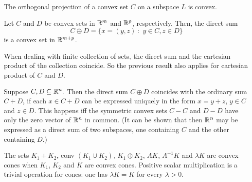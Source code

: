 \documentclass[11pt,a4paper]{article}
\begin{document}
\begin{corollary}
    The orthogonal projection of a convex set $C$ on a subspace $L$ is convex.
\end{corollary}


\begin{theorem}\label{thm:direct_sum_convex}
    Let $C$ and $D$ be convex sets in $\mathbb{R}^m$ and $\mathbb{R}^p$, respectively. Then, the direct sum
    \begin{equation*}
        C\oplus D = \{x = (y,z)\;:\; y\in C, z\in D\}
    \end{equation*}
    is a convex set in $\mathbb{R}^{m+p}$.
\end{theorem}

\begin{remark}\label{remark:direct_sum_cartesian_product}
    When dealing with finite collection of sets, the direct sum and the cartesian product of the collection coincide. So the previous result also applies for cartesian product of $C$ and $D$.
\end{remark}

\begin{remark}
    Suppose $C,D\subseteq\mathbb{R}^n$. Then the direct sum $C\oplus D$ coincides with the ordinary sum $C+D$, if each $x\in C+D$ can be expressed uniquely in the form $x = y+z$, $y\in C$ and $z\in D$. This happens iff the symmetric convex sets $C-C$ and $D-D$ have only the zero vector of $\mathbb{R}^n$ in common. (It can be shown that then $\mathbb{R}^n$ may be expressed as a direct sum of two subspaces, one containing $C$ and the other containing $D$.)
\end{remark}


\begin{remark}
    The sets $K_1+K_2$, conv $(K_1\cup K_2)$, $K_1\oplus K_2$, $AK$, $A^{-1}K$ and $\lambda K$ are convex cones when $K_1$, $K_2$ and $K$ are convex cones. Positive scalar multiplication is a trivial operation for cones: one has $\lambda K = K$ for every $\lambda >0$.
\end{remark}
\end{document}
